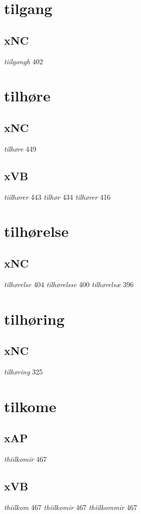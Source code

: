\documentclass[a4paper,twocolumn]{article}
\begin{document}
\section{tilgang}
\label{sec:org1a826f9}
\subsection{xNC}
\label{sec:orgf5b11d8}
\emph{tiilgongh} 402 
\section{tilhøre}
\label{sec:org3db096d}
\subsection{xNC}
\label{sec:org5688f1e}
\emph{tilhøre} 449 
\subsection{xVB}
\label{sec:orga81221a}
\emph{tiilhører} 443 \emph{tilhør} 434 \emph{tilhører} 416 
\section{tilhørelse}
\label{sec:org556de89}
\subsection{xNC}
\label{sec:orga7fbef5}
\emph{tilhørelse} 404 \emph{tilhørelsse} 400 \emph{tilhørelsæ} 396 
\section{tilhøring}
\label{sec:org4484a21}
\subsection{xNC}
\label{sec:org423482e}
\emph{tilhøring} 325 
\section{tilkome}
\label{sec:org5cb620a}
\subsection{xAP}
\label{sec:org021880a}
\emph{thiilkomir} 467 
\subsection{xVB}
\label{sec:org7d02bf9}
\emph{thiilkom} 467 \emph{thiilkomir} 467 \emph{thiilkommir} 467 
\end{document}

